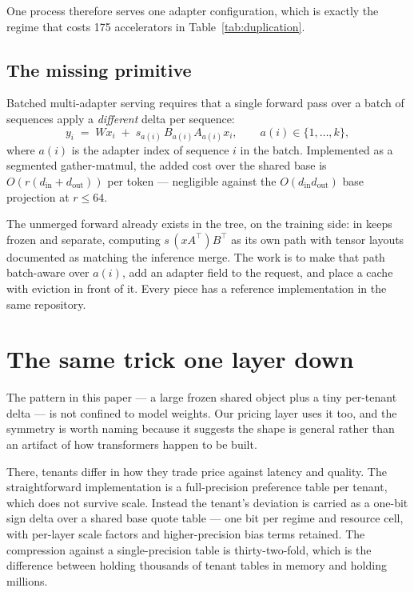 \documentclass[11pt,a4paper]{article}
\begin{document}
One process therefore serves one adapter configuration, which is exactly the
regime that costs \num{175} accelerators in Table~\ref{tab:duplication}.

\subsection{The missing primitive}

Batched multi-adapter serving requires that a single forward pass over a batch
of sequences apply a \emph{different} delta per sequence:
\begin{equation}
y_{i} \;=\; W x_{i} \;+\; s_{a(i)} \, B_{a(i)} A_{a(i)} x_{i},
\qquad a(i) \in \{1,\dots,k\},
\end{equation}
where $a(i)$ is the adapter index of sequence $i$ in the batch. Implemented as a
segmented gather-matmul, the added cost over the shared base is
$O(r(d_{\mathrm{in}}+d_{\mathrm{out}}))$ per token --- negligible against the
$O(d_{\mathrm{in}}d_{\mathrm{out}})$ base projection at $r \le 64$.

The unmerged forward already exists in the tree, on the training side:
 in  keeps  frozen and
 separate, computing $s\,(x A^{\!\top}) B^{\!\top}$
as its own path with tensor layouts documented as matching the inference merge.
The work is to make that path batch-aware over $a(i)$, add an adapter field to
the request, and place a cache with eviction in front of it. Every piece has a
reference implementation in the same repository.

\section{The same trick one layer down}

The pattern in this paper --- a large frozen shared object plus a tiny per-tenant
delta --- is not confined to model weights. Our pricing layer uses it too, and the
symmetry is worth naming because it suggests the shape is general rather than an
artifact of how transformers happen to be built.

There, tenants differ in how they trade price against latency and quality. The
straightforward implementation is a full-precision preference table per tenant,
which does not survive scale. Instead the tenant's deviation is carried as a
one-bit sign delta over a shared base quote table --- one bit per regime and
resource cell, with per-layer scale factors and higher-precision bias terms
retained. The compression against a single-precision table is thirty-two-fold,
which is the difference between holding thousands of tenant tables in memory and
holding millions.
\end{document}
